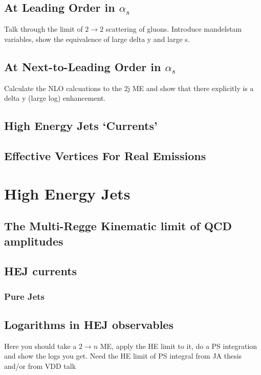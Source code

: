 	\subsection{At Leading Order in $\alpha_s$}
	\label{sub:HE22_LO}

	Talk through the limit of $2\rightarrow2$ scattering of gluons.  Introduce mandelstam variables, show the equivalence of large delta y and large s.

	\subsection{At Next-to-Leading Order in $\alpha_s$}
	\label{sub:HE22_NLO}

	Calculate the NLO calcuations to the 2j ME and show that there explicitly is a delta y (large log) enhancement.

	\subsection{High Energy Jets `Currents'}
	\label{sub:currents}

	\subsection{Effective Vertices For Real Emissions}
	\label{sub:effective_vertices_for_real_emissions}

\section{High Energy Jets}
\label{sec:section_name}

	\subsection{The Multi-Regge Kinematic limit of QCD amplitudes}
	\label{sub:subsection_name}

	\subsection{HEJ currents}
	\label{sub:subsection_name}

	\subsubsection{Pure Jets}
	\label{sub:subsection_name}

	\subsection{Logarithms in HEJ observables}
	\label{sub:subsection_name}

		Here you should take a $2\rightarrow n$ ME, apply the HE limit to it, do a PS integration and show the logs you get.  Need the HE limit of PS integral from JA thesis and/or from VDD talk

